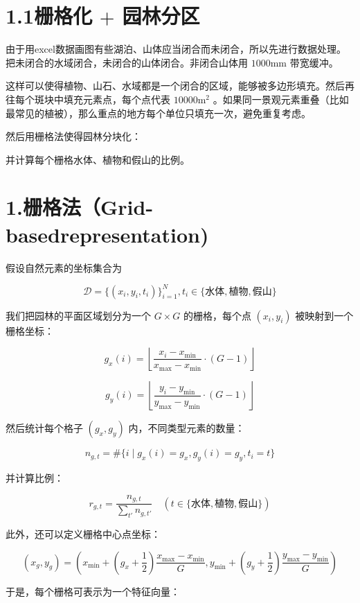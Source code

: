 


\section{\texorpdfstring{1.1栅格化 \(+\)
园林分区}{1.1栅格化 + 园林分区}}\label{ux6805ux683cux5316-ux56edux6797ux5206ux533a}

由于用excel数据画图有些湖泊、山体应当闭合而未闭合，所以先进行数据处理。把未闭合的水域闭合，未闭合的山体闭合。非闭合山体用
\(1000\mathrm{mm}\) 带宽缓冲。

这样可以使得植物、山石、水域都是一个闭合的区域，能够被多边形填充。然后再往每个斑块中填充元素点，每个点代表
\(10000\mathrm{m}^2\)
。如果同一景观元素重叠（比如最常见的植被），那么重点的地方每个单位只填充一次，避免重复考虑。

然后用栅格法使得园林分块化：

并计算每个栅格水体、植物和假山的比例。

\section{1.栅格法（Grid-basedrepresentation)}\label{ux6805ux683cux6cd5grid-basedrepresentation}

假设自然元素的坐标集合为

\[
\mathcal{D} = \{(x_i,y_i,t_i)\}_{i = 1}^N,t_i\in \{水体,植物,假山\}
\]

我们把园林的平面区域划分为一个 \(G\times G\) 的栅格，每个点
\((x_{i},y_{i})\) 被映射到一个栅格坐标：

\[
g_{x}(i) = \left\lfloor \frac{x_{i} - x_{\min}}{x_{\max} - x_{\min}}\cdot (G - 1)\right\rfloor
\]

\[
g_{y}(i) = \left\lfloor \frac{y_{i} - y_{\min}}{y_{\max} - y_{\min}}\cdot (G - 1)\right\rfloor
\]

然后统计每个格子 \((g_{x},g_{y})\) 内，不同类型元素的数量：

\[
n_{g,t} = \# \{i\mid g_x(i) = g_x,g_y(i) = g_y,t_i = t\}
\]

并计算比例：

\[
r_{g,t} = \frac{n_{g,t}}{\sum_{t'}n_{g,t'}}\quad (t\in \{水体,植物,假山\})
\]

此外，还可以定义栅格中心点坐标：

\[
(x_{g},y_{g}) = \left(x_{\min} + \left(g_{x} + \frac{1}{2}\right)\frac{x_{\max} - x_{\min}}{G},y_{\min} + \left(g_{y} + \frac{1}{2}\right)\frac{y_{\max} - y_{\min}}{G}\right)
\]

于是，每个栅格可表示为一个特征向量：

